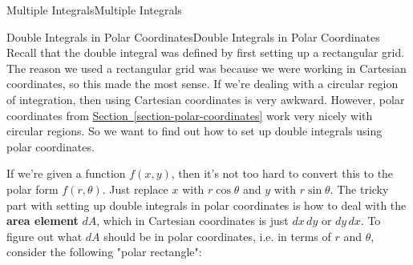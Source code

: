 \documentclass[10pt,]{book}
\newcommand{\terminology}[1]{\textbf{#1}}
\numberwithin{equation}{section}
\begin{document}
\begin{chapterptx}{Multiple Integrals}{}{Multiple Integrals}{}{}
\begin{sectionptx}{Double Integrals in Polar Coordinates}{}{Double Integrals in Polar Coordinates}{}{}
\hypertarget{p-1267}{}%
Recall that the double integral was defined by first setting up a rectangular grid. The reason we used a rectangular grid was because we were working in Cartesian coordinates, so this made the most sense. If we're dealing with a circular region of integration, then using Cartesian coordinates is very awkward. However, polar coordinates from \hyperref[section-polar-coordinates]{Section~\ref{section-polar-coordinates}} work very nicely with circular regions. So we want to find out how to set up double integrals using polar coordinates.%
\par
\hypertarget{p-1268}{}%
If we're given a function \(f(x,y)\), then it's not too hard to convert this to the polar form \(f(r,\theta)\). Just replace \(x\) with \(r\cos\theta\) and \(y\) with \(r\sin\theta\). The tricky part with setting up double integrals in polar coordinates is how to deal with the \terminology{area element} \(dA\), which in Cartesian coordinates is just \(dx\,dy\) or \(dy\,dx\). To figure out what \(dA\) should be in polar coordinates, i.e. in terms of \(r\) and \(\theta\), consider the following "polar rectangle": \begin{figure}
\centering
{
}
\end{figure}
\end{sectionptx}
\end{chapterptx}
\end{document}
